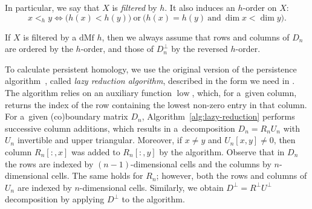 \documentclass[a4paper,12pt, USenglish,cleveref,autoref,thm-restate]{article}
\newcommand\bartek[1]{\textcolor{violet}{[BF: #1]}}
\newcommand{\mf}{h}
\DeclareMathOperator{\low}{low}
\newcommand{\dmf}{\text{dMf}}
\newcommand{\mU}{U}
\newcommand{\cmU}{\mU^{\perp}}
\newcommand{\mB}{D}
\newcommand{\hmB}{D}
\newcommand{\cmB}{D^{\perp}}
\newcommand{\mR}{R}
\newcommand{\cmR}{R^{\perp}}
\newcommand{\mD}{D}
\newcommand{\cmD}{D^{\perp}}
\newcommand{\cx}{x}
\newcommand{\cy}{y}
\newcommand{\RR}{\mathbb{R}}
\begin{document}
\noindent In particular, we say that $X$ is \emph{filtered} by $\mf$. 
It also induces an $\mf$-order on $X$:
%
\[
\cx <_{\mf} \cy \iff \big(\mf(\cx)<\mf(\cy)\big)\ \text{or}\ \big(\mf(\cx)=\mf(\cy)\ \text{and}\ \dim\cx<\dim\cy\big).
\]








\noindent If $X$ is filtered by a $\dmf$ $\mf$, 
    then we always assume that rows and columns of $\hmB_{n}$ are ordered by the $\mf$-order, 
    and those of $\cmB_{n}$ by the reversed $\mf$-order.
    
\noindent To calculate persistent homology, we use the original version of the persistence algorithm~\cite{ELZ02}, called \emph{lazy reduction algorithm}, described in the form we need in \cite{BigSteps}. The algorithm relies on an auxiliary function 
$\low$, which, for a~given column, returns the index of the row containing the lowest non-zero entry in that column. For a~given (co)boundary matrix $\mB_{n}$, Algorithm~\ref{alg:lazy-reduction} performs successive column additions, which results in a~decomposition $\mB_{n}=\mR_{n}\mU_{n}$ with $\mU_{n}$ invertible and upper triangular.  Moreover, if $\cx \neq \cy$ and $\mU_{n}[\cx, \cy] \neq 0$, then column $\mR_{n}[:, \cx]$ was added to $\mR_{n}[:, \cy]$ by the algorithm. Observe that in \(\mD_n\) the rows are indexed by \((n-1)\)-dimensional cells and the columns by \(n\)-dimensional cells.
The same holds for \(\mR_n\); however, both the rows and columns of \(\mU_n\) are indexed by \(n\)-dimensional cells.
Similarly, we obtain $\cmD=\cmR\cmU$ decomposition by applying $\cmD$ to the algorithm.
\end{document}
